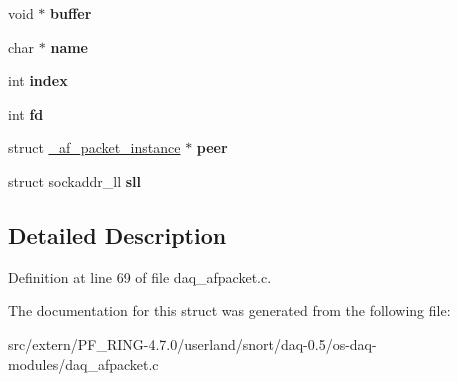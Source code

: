 \begin{DoxyCompactItemize}
\item 
\hypertarget{struct__af__packet__instance_af294028d42ca3c1784cea944e5314164}{
void $\ast$ {\bfseries buffer}}
\label{struct__af__packet__instance_af294028d42ca3c1784cea944e5314164}

\item 
\hypertarget{struct__af__packet__instance_acfb088b6b9b3a53d41664292b548d534}{
char $\ast$ {\bfseries name}}
\label{struct__af__packet__instance_acfb088b6b9b3a53d41664292b548d534}

\item 
\hypertarget{struct__af__packet__instance_abe9eb079f0b9c15ef846f816b9e0062d}{
int {\bfseries index}}
\label{struct__af__packet__instance_abe9eb079f0b9c15ef846f816b9e0062d}

\item 
\hypertarget{struct__af__packet__instance_af0bdcd06ada0d0300727aae7595fcf28}{
int {\bfseries fd}}
\label{struct__af__packet__instance_af0bdcd06ada0d0300727aae7595fcf28}

\item 
\hypertarget{struct__af__packet__instance_a30347527d528d4e75ca7baa336336f99}{
struct \hyperlink{struct__af__packet__instance}{\_\-af\_\-packet\_\-instance} $\ast$ {\bfseries peer}}
\label{struct__af__packet__instance_a30347527d528d4e75ca7baa336336f99}

\item 
\hypertarget{struct__af__packet__instance_a21d118d5606f9ff0af7bf4d3022310f9}{
struct sockaddr\_\-ll {\bfseries sll}}
\label{struct__af__packet__instance_a21d118d5606f9ff0af7bf4d3022310f9}

\end{DoxyCompactItemize}


\subsection{Detailed Description}


Definition at line 69 of file daq\_\-afpacket.c.



The documentation for this struct was generated from the following file:\begin{DoxyCompactItemize}
\item 
src/extern/PF\_\-RING-\/4.7.0/userland/snort/daq-\/0.5/os-\/daq-\/modules/daq\_\-afpacket.c\end{DoxyCompactItemize}
